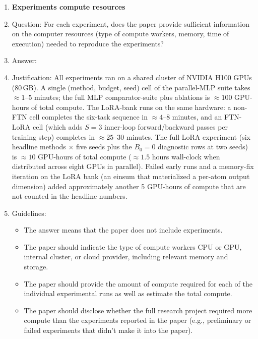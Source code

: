 \begin{enumerate}
\begin{itemize}
        \item For asymmetric distributions, the authors should be careful not to show in tables or figures symmetric error bars that would yield results that are out of range (e.g., negative error rates).
        \item If error bars are reported in tables or plots, the authors should explain in the text how they were calculated and reference the corresponding figures or tables in the text.
    \end{itemize}

\item {\bf Experiments compute resources}
    \item[] Question: For each experiment, does the paper provide sufficient information on the computer resources (type of compute workers, memory, time of execution) needed to reproduce the experiments?
    \item[] Answer: \answerYes{}
    \item[] Justification: All experiments ran on a shared cluster of NVIDIA H100 GPUs (80\,GB). A single (method, budget, seed) cell of the parallel-MLP suite takes ${\approx}1$--$5$ minutes; the full MLP comparator-suite plus ablations is ${\approx}100$ GPU-hours of total compute. The LoRA-bank runs on the same hardware: a non-FTN cell completes the six-task sequence in ${\approx}4$--$8$ minutes, and an FTN-LoRA cell (which adds $S{=}3$ inner-loop forward/backward passes per training step) completes in ${\approx}25$--$30$ minutes. The full LoRA experiment (six headline methods $\times$ five seeds plus the $B_0{=}0$ diagnostic rows at two seeds) is ${\approx}10$ GPU-hours of total compute (${\approx}1.5$ hours wall-clock when distributed across eight GPUs in parallel). Failed early runs and a memory-fix iteration on the LoRA bank (an einsum that materialized a per-atom output dimension) added approximately another 5 GPU-hours of compute that are not counted in the headline numbers.
    \item[] Guidelines:
    \begin{itemize}
        \item The answer \answerNA{} means that the paper does not include experiments.
        \item The paper should indicate the type of compute workers CPU or GPU, internal cluster, or cloud provider, including relevant memory and storage.
        \item The paper should provide the amount of compute required for each of the individual experimental runs as well as estimate the total compute.
        \item The paper should disclose whether the full research project required more compute than the experiments reported in the paper (e.g., preliminary or failed experiments that didn't make it into the paper).
    \end{itemize}


\end{enumerate}
